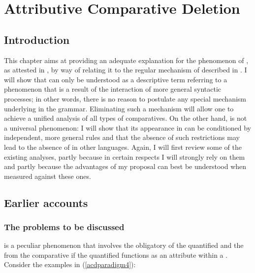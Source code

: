 \chapter {Attributive Comparative Deletion} \label{ch:4}
\section {Introduction} \label{sec:4introduction}
This chapter aims at providing an adequate explanation for the phenomenon of , as attested in , by way of relating it to the regular mechanism of  described in . I will show that  can only be understood as a descriptive term referring to a phenomenon that is a result of the interaction of more general syntactic processes; in other words, there is no reason to postulate any special mechanism underlying  in the grammar. Eliminating such a mechanism will allow one to achieve a unified analysis of all types of comparatives. On the other hand,  is not a universal phenomenon: I will show that its appearance in  can be conditioned by independent, more general rules and that the absence of such restrictions may lead to the absence of  in other languages. Again, I will first review some of the existing analyses, partly because in certain respects I will strongly rely on them and partly because the advantages of my proposal can best be understood when measured against these ones.

\section{Earlier accounts} \label{sec:4earlier}
\subsection{The problems to be discussed} \label{sec:4problems}
 is a peculiar phenomenon that involves the obligatory  of the quantified  and the  from the comparative  if the quantified  functions as an attribute within a . Consider the examples in (\ref{acdparadigm4}):

\ea \label{acdparadigm4}
 \label{acd}
 \label{acdlex}
 \label{adjdel}
 \label{verbdel}
\z
\z

